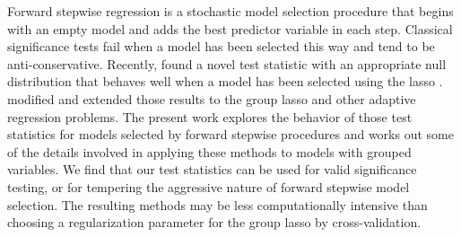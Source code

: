 \documentclass{imsart}
\begin{document}
Forward stepwise regression is a stochastic model selection procedure
that begins with an empty model and adds the best predictor variable
in each step.  Classical significance tests fail when a model has been
selected this way and tend to be anti-conservative.  Recently,
\cite{significance:lasso} found a novel test statistic with an
appropriate null distribution that behaves well when a model has been
selected using the lasso \citep{tibshirani:lasso}.
\cite{tests:adaptive} modified and extended those results to the
group lasso \citep{grouplasso} and other adaptive regression
problems.  The present work
explores the behavior of those test statistics for models selected by
forward stepwise procedures and works out some of the details
involved in applying these methods to models with grouped variables.
We find that our test statistics can be used for valid significance
testing, or for tempering the aggressive nature of forward stepwise
model selection.  The resulting methods may be less computationally
intensive than choosing a regularization parameter for the group lasso
by cross-validation.  
\end{document}
